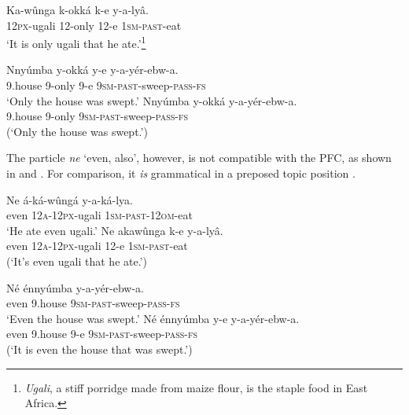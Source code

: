 \documentclass[output=paper]{langsci/langscibook}
\begin{document}
\ea\label{ex:vanderwal:20}
\gll   Ka-wûnga  k-okká    k-e  y-a-lyâ.{} \\
       \textsc{12px}-ugali  12-only  12-e  \textsc{1sm}-\textsc{past}-eat\\
\glt   ‘It is only ugali that he ate.’\footnote{\textit{Ugali}, a stiff porridge made from maize flour, is the staple food in East Africa.}
\z

\ea\label{ex:vanderwal:21}
\ea\label{ex:vanderwal:21a}
\gll      Nnyúmba  y-okká  y-e  y-a-yér-ebw-a.\\
         9.house  9-only  9-e  \textsc{9sm}-\textsc{past}-sweep-\textsc{pass}-\textsc{fs}\\
\glt     ‘Only the house was swept.’
\ex\label{ex:vanderwal:21b}
\gll     *Nnyúmba  y-okká    y-a-yér-ebw-a.\\
         9.house  9-only    \textsc{9sm}-\textsc{past}-sweep-\textsc{pass}-\textsc{fs}\\
\glt     (‘Only the house was swept.’)
\z
\z

The particle \textit{ne} ‘even, also’, however, is not compatible with the PFC, as shown in  and . For comparison, it \textit{is} grammatical in a preposed topic position .

\ea\label{ex:vanderwal:22}
\ea\label{ex:vanderwal:22a}
\gll     Ne  á-ká-wûngá    y-a-ká-lya.\\
         even  \textsc{12a}-\textsc{12px}-ugali  \textsc{1sm}-\textsc{past}-\textsc{12om}-eat\\
\glt     ‘He ate even ugali.’
\ex \label{ex:vanderwal:22b}
\gll     *Ne  akawûnga    k-e  y-a-lyâ.\\
         even  \textsc{12a}-\textsc{12px}-ugali  12-e  \textsc{1sm}-\textsc{past}-eat\\
\glt     (‘It’s even ugali that he ate.’)
\z
\z

\ea\label{ex:vanderwal:23}
\ea\label{ex:vanderwal:23a}
\gll     Né  énnyúmba  y-a-yér-ebw-a.\\
         even  9.house  \textsc{9sm}-\textsc{past}-sweep-\textsc{pass}-\textsc{fs}\\
\glt     ‘Even the house was swept.’
\ex\label{ex:vanderwal:23b}
\gll      *Né  énnyúmba  y-e  y-a-yér-ebw-a.\\
         even  9.house  9-e  \textsc{9sm}-\textsc{past}-sweep-\textsc{pass}-\textsc{fs}\\
\glt     (‘It is even the house that was swept.’)
\z
\z
\end{document}
